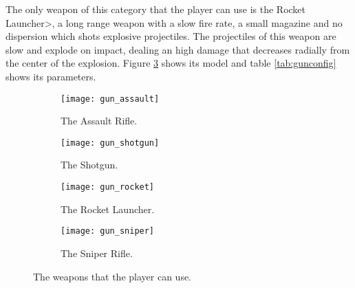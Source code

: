 The only weapon of this category that the player can use is the \<Rocket Launcher>, a long range weapon with a slow fire rate, a small magazine and no dispersion which shots explosive projectiles. The projectiles of this weapon are slow and explode on impact, dealing an high damage that decreases radially from the center of the explosion. Figure \ref{fig:rocket} shows its model and table \ref{tab:gunconfig} shows its parameters.

\begin{figure}[p]
\centering
\begin{subfigure}[t]{0.48\linewidth}
\texttt{[image: gun\_assault]}
\caption{The Assault Rifle.}
\label{fig:assault}
\end{subfigure}
\begin{subfigure}[t]{0.48\linewidth}
\texttt{[image: gun\_shotgun]}
\caption{The Shotgun.}
\label{fig:shotgun}
\end{subfigure}
\begin{subfigure}[t]{0.48\linewidth}
\texttt{[image: gun\_rocket]}
\caption{The Rocket Launcher.}
\label{fig:rocket}
\end{subfigure}
\begin{subfigure}[t]{0.48\linewidth}
\texttt{[image: gun\_sniper]}
\caption{The Sniper Rifle.}
\label{fig:sniper}
\end{subfigure}
\caption{The weapons that the player can use.}
\end{figure}

